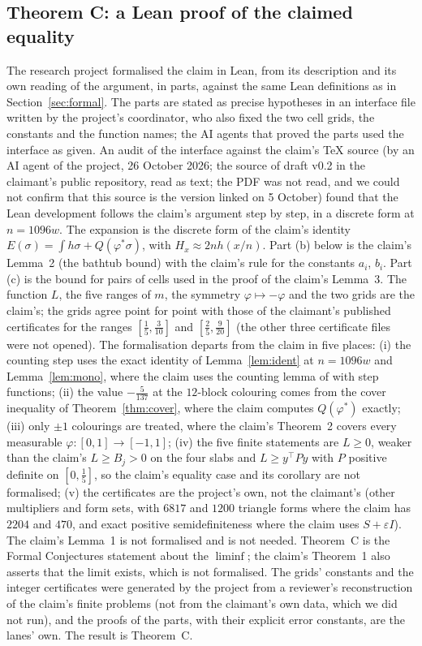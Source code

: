 \documentclass[11pt]{amsart}
\theoremstyle{remark}
\begin{document}
\subsection{Theorem C: a Lean proof of the claimed equality}\label{sec:thmC}
The research project formalised the claim in Lean, from its description and its own reading of the argument, in parts, against the same Lean definitions as in Section~\ref{sec:formal}. The parts are stated as precise hypotheses in an interface file written by the project's coordinator, who also fixed the two cell grids, the constants and the function names; the AI agents that proved the parts used the interface as given. An audit of the interface against the claim's TeX source (by an AI agent of the project, 26 October 2026; the source of draft v0.2 in the claimant's public repository, read as text; the PDF was not read, and we could not confirm that this source is the version linked on 5 October) found that the Lean development follows the claim's argument step by step, in a discrete form at $n=1096w$. The expansion is the discrete form of the claim's identity $E(\sigma)=\int h\sigma+Q(\varphi^*\sigma)$, with $H_x\approx 2nh(x/n)$. Part (b) below is the claim's Lemma~2 (the bathtub bound) with the claim's rule for the constants $a_i$, $b_i$. Part (c) is the bound for pairs of cells used in the proof of the claim's Lemma~3. The function $L$, the five ranges of $m$, the symmetry $\varphi\mapsto-\varphi$ and the two grids are the claim's; the grids agree point for point with those of the claimant's published certificates for the ranges $[\frac15,\frac3{10}]$ and $[\frac25,\frac9{20}]$ (the other three certificate files were not opened). The formalisation departs from the claim in five places: (i) the counting step uses the exact identity of Lemma~\ref{lem:ident} at $n=1096w$ and Lemma~\ref{lem:mono}, where the claim uses the counting lemma of \cite{PRS08} with step functions; (ii) the value $-\frac5{137}$ at the $12$-block colouring comes from the cover inequality of Theorem~\ref{thm:cover}, where the claim computes $Q(\varphi^*)$ exactly; (iii) only $\pm1$ colourings are treated, where the claim's Theorem~2 covers every measurable $\varphi\colon[0,1]\to[-1,1]$; (iv) the five finite statements are $L\ge0$, weaker than the claim's $L\ge B_j>0$ on the four slabs and $L\ge y^\top Py$ with $P$ positive definite on $[0,\frac15]$, so the claim's equality case and its corollary are not formalised; (v) the certificates are the project's own, not the claimant's (other multipliers and form sets, with $6817$ and $1200$ triangle forms where the claim has $2204$ and $470$, and exact positive semidefiniteness where the claim uses $S+\varepsilon I$). The claim's Lemma~1 is not formalised and is not needed. Theorem~C is the Formal Conjectures statement about the $\liminf$; the claim's Theorem~1 also asserts that the limit exists, which is not formalised. The grids' constants and the integer certificates were generated by the project from a reviewer's reconstruction of the claim's finite problems (not from the claimant's own data, which we did not run), and the proofs of the parts, with their explicit error constants, are the lanes' own. The result is Theorem~C.
\end{document}
